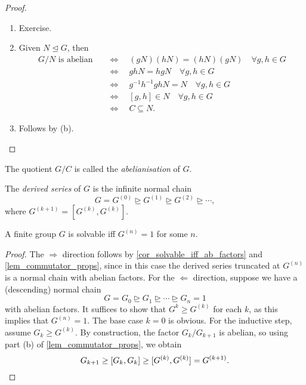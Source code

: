 \begin{proof}~
    \begin{enumerate}[label=(\alph*)]
        \item Exercise.
        \item Given $N \unlhd G$, then
        \begin{align*}
            G/N \text{ is abelian}
            &\quad \iff \quad
            (gN)(hN) = (hN)(gN) \quad \forall g, h \in G \\
            &\quad \iff \quad
            ghN = hgN \quad \forall g, h \in G \\
            &\quad \iff \quad
            g^{-1}h^{-1}ghN = N \quad \forall g, h \in G \\
            &\quad \iff \quad
            [g, h] \in N \quad \forall g, h \in G \\
            &\quad \iff \quad
            C \subseteq N.
        \end{align*}
        \item Follows by (b). \qedhere
    \end{enumerate}
\end{proof}

\begin{remark}
    The quotient $G/C$ is called the \emph{abelianisation} of $G$.
\end{remark}

\begin{definition}
    The \emph{derived series} of $G$ is the infinite normal chain
    \[
        G = G^{(0)} \unrhd G^{(1)} \unrhd G^{(2)} \unrhd \cdots,
    \]
    where $G^{(k + 1)} = [G^{(k)}, G^{(k)}].$
\end{definition}

\begin{corollary}
    A finite group $G$ is solvable iff $G^{(n)} = 1$ for some $n$.
\end{corollary}

\begin{proof}
    The $\Rightarrow$ direction follows by \cref{cor_solvable_iff_ab_factors} and \cref{lem_commutator_props}, since in this case the derived series truncated at $G^{(n)}$ is a normal chain with abelian factors. For the $\Leftarrow$ direction, suppose we have a (descending) normal chain
    \[
        G = G_0 \unrhd G_1 \unrhd \cdots \unrhd G_n = 1
    \]
    with abelian factors. It suffices to show that $G^{k} \geq G^{(k)}$ for each $k$, as this implies that $G^{(n)} = 1$. The base case $k = 0$ is obvious. For the inductive step, assume $G_k \geq G^{(k)}$. By construction, the factor $G_k/G_{k + 1}$ is abelian, so using part (b) of \cref{lem_commutator_props}, we obtain
    \[
        G_{k + 1} \geq [G_k, G_k] \geq [G^{(k)}, G^{(k)}] = G^{(k + 1)}. \qedhere
    \]
\end{proof}

